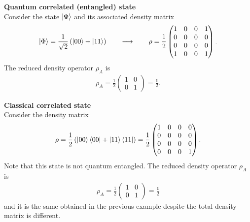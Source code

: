 \begin{tcolorbox} 
\textbf{Quantum correlated (entangled) state} \\ 
Consider the state $\ket{\Phi}$ and its associated density matrix
\begin{align*}
    \ket{\Phi} = \frac{1}{\sqrt{2}} \left( \ket{0 0 } + \ket{1 1} \right) \qquad \longrightarrow \qquad \rho = \frac{1}{2} \begin{pmatrix} 1 & 0 & 0 & 1 \\ 0 & 0 & 0 & 0 \\ 0 & 0 & 0 & 0 \\ 1 & 0 & 0 & 1 \end{pmatrix}.
\end{align*}
The reduced density operator $\rho_A$ is 
\begin{align*}
    \rho_A  = \frac{1}{2} \begin{pmatrix} 1 & 0 \\ 0 & 1 \end{pmatrix} = \frac{\mathbb{1}}{2}.
\end{align*}
\end{tcolorbox}

\begin{tcolorbox} 
\textbf{Classical correlated state} \\ 
Consider the density matrix
\begin{align*}
    \rho = \frac{1}{2} \left( \ket{00} \bra{00} + \ket{11} \bra{11} \right) = \frac{1}{2} \begin{pmatrix} 1 & 0 & 0 & 0 \\ 0 & 0 & 0 & 0 \\ 0 & 0 & 0 & 0 \\ 0 & 0 & 0 & 1 \end{pmatrix}.
\end{align*}
Note that this state is not quantum entangled. The reduced density operator $\rho_A$ is 
\begin{align*}
    \rho_A = \frac{1}{2} \begin{pmatrix} 1 & 0 \\ 0 & 1 \end{pmatrix} = \frac{\mathbb{1}}{2}
\end{align*}
and it is the same obtained in the previous example despite the total density matrix is different.
\end{tcolorbox}

